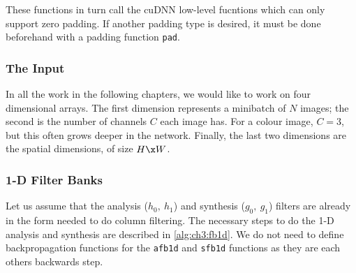 These functions in turn call the cuDNN low-level fucntions which can only support
zero padding. If another padding type is desired, it must be done beforehand
with a padding function \texttt{pad}.

\subsubsection{The Input}
In all the work in the following chapters, we would like to work on four
dimensional arrays. The first dimension represents a minibatch of $N$ images;
the second is the number of channels $C$ each image has. For a colour image,
$C=3$, but this often grows deeper in the network. Finally, the last two
dimensions are the spatial dimensions, of size $H\x W$. 

\subsubsection{1-D Filter Banks}
Let us assume that the analysis ($h_0,\ h_1$) and synthesis ($g_0,\ g_1$)
filters are already in the form needed to do column filtering. The necessary
steps to do the 1-D analysis and synthesis are described in
\autoref{alg:ch3:fb1d}. We do not need to define backpropagation functions for the
\texttt{afb1d} and \texttt{sfb1d} functions as they are each others backwards
step.

